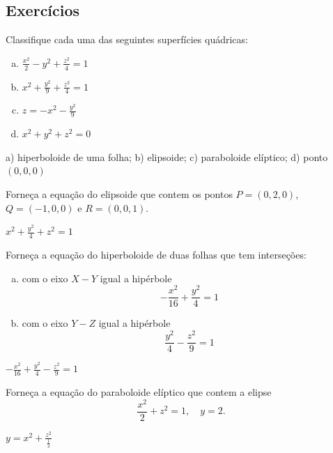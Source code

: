 \subsection*{Exercícios}

\begin{exer}
  Classifique cada uma das seguintes superfícies quádricas:
  \begin{enumerate}[a)]
  \item $\displaystyle \frac{x^2}{2}-y^2+\frac{z^2}{4}=1$
  \item $\displaystyle x^2+\frac{y^2}{9}+\frac{z^2}{4}=1$
  \item $\displaystyle z = -x^2-\frac{y^2}{9}$
  \item $\displaystyle x^2 + y^2 + z^2 = 0$
  \end{enumerate}
\end{exer}
\begin{resp}
  a) hiperboloide de uma folha; b) elipsoide; c) paraboloide elíptico; d) ponto $(0, 0, 0)$
\end{resp}

\begin{exer}
  Forneça a equação do elipsoide que contem os pontos $P=(0,2,0)$, $Q=(-1,0,0)$ e $R=(0,0,1)$.
\end{exer}
\begin{resp}
  $\displaystyle x^2+\frac{y^2}{4}+z^2=1$
\end{resp}

\begin{exer}
  Forneça a equação do hiperboloide de duas folhas que tem interseções:
  \begin{enumerate}[a)]
  \item com o eixo $X-Y$ igual a hipérbole
    \begin{equation}
      -\frac{x^2}{16}+\frac{y^2}{4}=1
    \end{equation}
  \item com o eixo $Y-Z$ igual a hipérbole
    \begin{equation}
      \frac{y^2}{4}-\frac{z^2}{9}=1
    \end{equation}
  \end{enumerate}
\end{exer}
\begin{resp}
  $\displaystyle -\frac{x^2}{16}+\frac{y^2}{4}-\frac{z^2}{9}=1$
\end{resp}

\begin{exer}
  Forneça a equação do paraboloide elíptico que contem a elipse
  \begin{equation}
    \frac{x^2}{2}+z^2=1,\quad y=2.
  \end{equation}
\end{exer}
\begin{resp}
  $\displaystyle y = x^2+\frac{z^2}{\frac{1}{2}}$
\end{resp}

